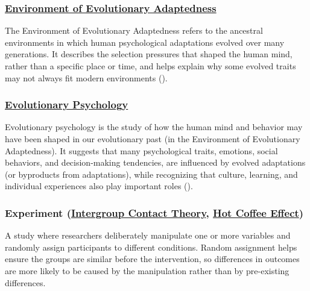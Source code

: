 \documentclass[
  letterpaper,
]{book}
\begin{document}
\subsubsection*{\texorpdfstring{\hyperref[def-environmentofevolutionaryadaptedness]{Environment
of Evolutionary
Adaptedness}}{Environment of Evolutionary Adaptedness}}\label{environment-of-evolutionary-adaptedness}

The Environment of Evolutionary Adaptedness refers to the ancestral
environments in which human psychological adaptations evolved over many
generations. It describes the selection pressures that shaped the human
mind, rather than a specific place or time, and helps explain why some
evolved traits may not always fit modern environments
().

\subsubsection*{\texorpdfstring{\hyperref[def-evolutionarypsychology]{Evolutionary
Psychology}}{Evolutionary Psychology}}\label{evolutionary-psychology}

Evolutionary psychology is the study of how the human mind and behavior
may have been shaped in our evolutionary past (in the Environment of
Evolutionary Adaptedness). It suggests that many psychological traits,
emotions, social behaviors, and decision-making tendencies, are
influenced by evolved adaptations (or byproducts from adaptations),
while recognizing that culture, learning, and individual experiences
also play important roles ().

\subsubsection*{\texorpdfstring{Experiment
(\hyperref[def-experiment]{Intergroup Contact Theory},
\hyperref[def-experiment]{Hot Coffee
Effect})}{Experiment (Intergroup Contact Theory, Hot Coffee Effect)}}\label{experiment-intergroup-contact-theory-hot-coffee-effect}

A study where researchers deliberately manipulate one or more variables
and randomly assign participants to different conditions. Random
assignment helps ensure the groups are similar before the intervention,
so differences in outcomes are more likely to be caused by the
manipulation rather than by pre-existing differences.
\end{document}
